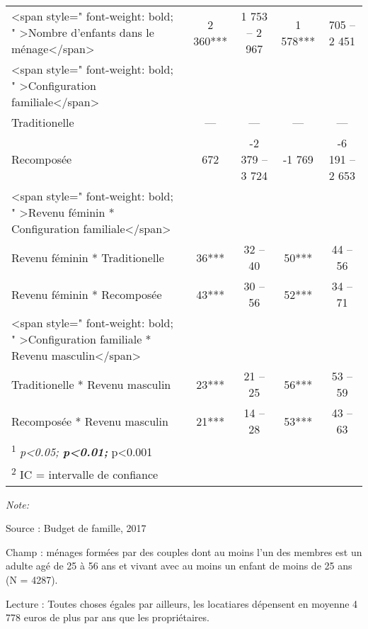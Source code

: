 \documentclass[
  12pt,
]{book}
\begin{document}
\begin{table}[!h]
\begin{threeparttable}
\begin{tabular}[t]{lcccc}
<span style=" font-weight: bold;    " >Nombre d'enfants dans le ménage</span> & 2 360*** & 1 753 – 2 967 & 1 578*** & 705 – 2 451\\
<span style=" font-weight: bold;    " >Configuration familiale</span> &  &  &  & \\
\hspace{1em}Traditionelle & — & — & — & —\\
\addlinespace
\hspace{1em}Recomposée & 672 & -2 379 – 3 724 & -1 769 & -6 191 – 2 653\\
<span style=" font-weight: bold;    " >Revenu féminin * Configuration familiale</span> &  &  &  & \\
\hspace{1em}Revenu féminin * Traditionelle & 36*** & 32 – 40 & 50*** & 44 – 56\\
\hspace{1em}Revenu féminin * Recomposée & 43*** & 30 – 56 & 52*** & 34 – 71\\
<span style=" font-weight: bold;    " >Configuration familiale * Revenu masculin</span> &  &  &  & \\
\addlinespace
\hspace{1em}Traditionelle * Revenu masculin & 23*** & 21 – 25 & 56*** & 53 – 59\\
\hspace{1em}Recomposée * Revenu masculin & 21*** & 14 – 28 & 53*** & 43 – 63\\
\bottomrule
\multicolumn{5}{l}{\rule{0pt}{1em}\textsuperscript{1} \textit{p<0.05; \textbf{p<0.01; }}p<0.001}\\
\multicolumn{5}{l}{\rule{0pt}{1em}\textsuperscript{2} IC = intervalle de confiance}\\
\end{tabular}
\begin{tablenotes}
\item \textit{Note: } 
\item Source : Budget de famille, 2017
\item Champ : ménages formées par des couples dont au moins l'un des membres est un adulte agé de 25 à 56 ans et vivant avec au moins un enfant de moins de 25 ans (N = 4287).
\item Lecture : Toutes choses égales par ailleurs, les locatiares dépensent en moyenne 4 778 euros de plus par ans que les propriétaires. 
\end{tablenotes}
\end{threeparttable}
\end{table}
\end{document}
